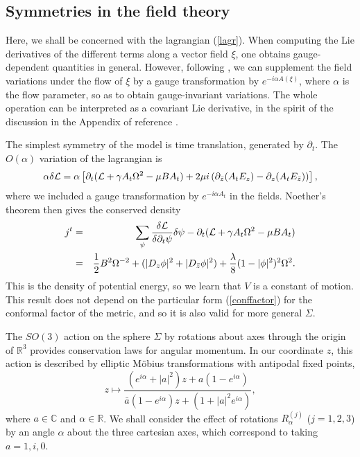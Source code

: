\documentclass[a4paper,11pt]{article}
\begin{document}
\subsection {Symmetries in the field theory}


Here, we shall be concerned with the lagrangian (\ref{lagr}).
When computing the Lie derivatives of the different terms along a
vector field $\xi$, one obtains gauge-dependent quantities in
general. However, following \cite{MNcl},
we can supplement the 
field variations under the flow of $\xi$ by a gauge transformation by
$e^{-i\alpha A(\xi)}$, where $\alpha$ is the flow parameter, so as 
to obtain gauge-invariant variations.
The whole operation can be interpreted as a covariant Lie derivative,
in the spirit of the discussion in the Appendix of reference \cite{Sturr}.


The simplest symmetry of the model is time translation, generated by
$\partial_{t}$.  The $O(\alpha)$ variation of the lagrangian is
\[
\alpha \delta {\cal L}=\alpha\left[
\partial_{t}({\cal L}+\gamma A_{t}\Omega^{2}- \mu B A_{t})
+2\mu i\left(\partial_{\bar{z}}(A_{t}E_{z})-\partial_{z}(A_{t}E_{\bar{z}})\right)\right],
\]
where we included a gauge transformation by $e^{-i\alpha A_{t}}$ in
the fields. Noether's theorem then gives the conserved density
\begin{eqnarray*}
j^{t}&=&\sum_{\psi}\frac{\delta {\cal L}}{\delta\partial_{t}\psi}\delta\psi
-\partial_{t}({\cal L}+\gamma A_{t}\Omega^{2}- \mu B A_{t})\\
&=& \frac{1}{2}B^{2}\Omega^{-2}+
(|D_{z}\phi|^{2}+ |D_{\bar{z}}\phi|^{2})
+\frac{\lambda}{8}(1-|\phi|^{2})^{2}\Omega^{2}.
\end{eqnarray*}
This is the density of potential energy, so we learn that $V$ is a
constant of motion. This result does not depend on the particular form
(\ref{conffactor}) for the conformal factor of the metric, and so it
is also valid for more general $\Sigma$.


The $SO(3)$ action on the sphere $\Sigma$ by rotations about axes
through the origin of $\mathbb{R}^{3}$ provides conservation
laws for angular momentum. In our coordinate $z$, this action is
described by elliptic M\"obius transformations with antipodal fixed points,
\begin{equation}\label{Moeb}
z\mapsto \frac{(e^{i\alpha}+|a|^{2})z+a(1-e^{i\alpha})}
{\bar{a}(1-e^{i\alpha})z+(1+|a|^{2}e^{i\alpha})},
\end{equation}
where $a \in \mathbb{C}$ and $\alpha \in \mathbb{R}$. We shall
consider the effect of rotations $R^{(j)}_{\alpha}$ ($j=1,2,3$) 
by an angle $\alpha$ about the three cartesian axes, which 
correspond to taking $a=1,i,0$.
\end{document}
